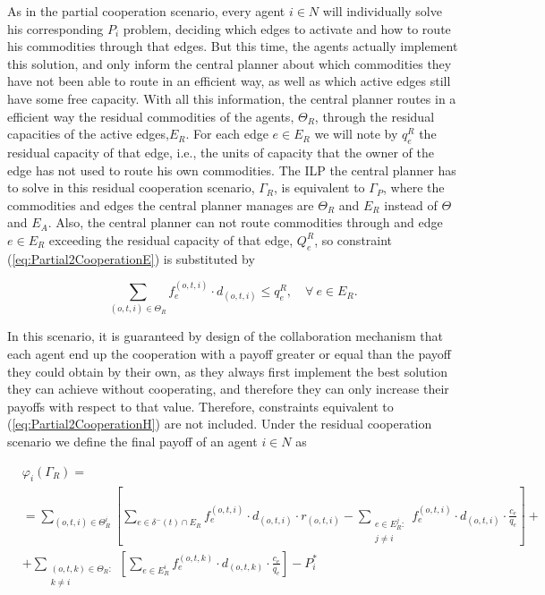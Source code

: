 \documentclass[review]{elsarticle}
\begin{document}
As in the partial cooperation scenario, every agent $i\in N$ will individually solve his corresponding $P_i$ problem, deciding which edges to activate and how to route his commodities through that edges. But this time, the agents actually implement this solution, and only inform the central planner about which commodities they have not been able to route in an efficient way, as well as which active edges still have some free capacity. With all this information, the central planner routes in a efficient way the residual commodities of the agents, $\Theta_R$, through the residual capacities of the active edges,$E_R$. For each edge $e \in E_R$ we will note by $q_e^R$ the residual capacity of that edge, i.e., the units of capacity that the owner of the edge has not used to route his own commodities. The ILP the central planner has to solve in this residual cooperation scenario, $\Gamma_R$, is equivalent to $\Gamma_P$, where the commodities and edges the central planner manages are $\Theta_R$ and $E_R$ instead of $\Theta$ and $E_A$. Also, the central planner can not route commodities through and edge $e\in E_R$ exceeding the residual capacity of that edge, $Q_e^R$, so constraint (\ref{eq:Partial2CooperationE}) is substituted by

\begin{equation}
\sum_{(o,t,i) \in \Theta_R} f_e^{(o,t,i)}\cdot d_{(o,t,i)} \leq q_e^R,\quad \forall\ e \in E_R.
\end{equation}

    
In this scenario, it is guaranteed by design of the collaboration mechanism that each agent end up the cooperation with a payoff greater or equal than the payoff they could obtain by their own, as they always first implement the best solution they can achieve without cooperating, and therefore they can only increase their payoffs with respect to that value. Therefore, constraints equivalent to (\ref{eq:Partial2CooperationH}) are not included. Under the residual cooperation scenario we define the final payoff of an agent $i\in N$ as

\begin{equation}
    \begin{split}
    & \varphi_i(\Gamma_R) =\label{eq:ResidualCooperationPayoff} \\
    & = \sum_{(o,t,i)\in \Theta^i_R} \left[ \sum_{e \in \delta^-(t)\cap E_R} f_e^{(o,t,i)} \cdot d_{(o,t,i)} \cdot r_{(o,t,i)} -  \sum_{\substack{e\in E^j_R \colon\\ j\not = i}} f_e^{(o,t,i)} \cdot d_{(o,t,i)} \cdot \frac{c_e}{q_e} \right] + \\
    & + \sum_{\substack{(o,t,k) \in \Theta_R  \colon \\ k \not = i}} \left[\sum_{e \in E_R^i} f_e^{(o,t,k)} \cdot d_{(o,t,k)} \cdot \frac{c_e}{q_e}\right] - P_i^*
    \end{split}
\end{equation}
\end{document}
